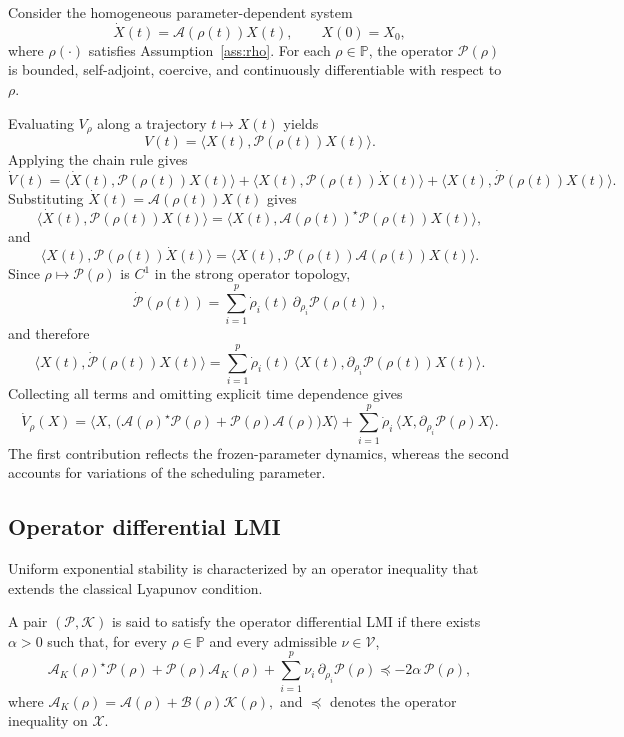 \documentclass[AMA,Times2COL]{WileyNJDv5}
\begin{document}
Consider the homogeneous parameter-dependent system
\begin{equation}\label{eq:LPV-homog}
\dot X(t)=\mathcal{A}(\rho(t))X(t),
\qquad X(0)=X_0,
\end{equation}
where $\rho(\cdot)$ satisfies Assumption~\ref{ass:rho}.  
For each $\rho\in\mathbb{P}$, the operator $\mathcal{P}(\rho)$ is bounded, self-adjoint, coercive, and continuously differentiable with respect to~$\rho$.

Evaluating $V_\rho$ along a trajectory $t\mapsto X(t)$ yields
\[
V(t)=\langle X(t),\mathcal{P}(\rho(t))X(t)\rangle .
\]
Applying the chain rule gives
\[
\dot V(t)
=
\langle \dot X(t),\mathcal{P}(\rho(t))X(t)\rangle
+
\langle X(t),\mathcal{P}(\rho(t))\dot X(t)\rangle
+
\langle X(t),\dot{\mathcal{P}}(\rho(t))X(t)\rangle .
\]
Substituting $\dot X(t)=\mathcal{A}(\rho(t))X(t)$ gives
\[
\langle \dot X(t),\mathcal{P}(\rho(t))X(t)\rangle
=
\langle X(t),\mathcal{A}(\rho(t))^{\star}
\mathcal{P}(\rho(t))X(t)\rangle,
\]
and
\[
\langle X(t),\mathcal{P}(\rho(t))\dot X(t)\rangle
=
\langle X(t),\mathcal{P}(\rho(t))
\mathcal{A}(\rho(t))X(t)\rangle .
\]
Since $\rho\mapsto\mathcal{P}(\rho)$ is $C^1$ in the strong operator topology,
\[
\dot{\mathcal{P}}(\rho(t))
=
\sum_{i=1}^{p}\dot\rho_i(t)\,
\partial_{\rho_i}\mathcal{P}(\rho(t)),
\]
and therefore
\[
\langle X(t),\dot{\mathcal{P}}(\rho(t))X(t)\rangle
=
\sum_{i=1}^{p}\dot\rho_i(t)\,
\langle X(t),\partial_{\rho_i}\mathcal{P}(\rho(t))X(t)\rangle .
\]
Collecting all terms and omitting explicit time dependence gives
\begin{equation}\label{eq:Lyap-derivative}
\dot V_\rho(X)
=
\big\langle X,\,
\big(
\mathcal{A}(\rho)^{\star}\mathcal{P}(\rho)
+
\mathcal{P}(\rho)\mathcal{A}(\rho)
\big)X\big\rangle
+
\sum_{i=1}^{p}\dot\rho_i\,
\big\langle X,\partial_{\rho_i}\mathcal{P}(\rho)X\big\rangle .
\end{equation}
The first contribution reflects the frozen-parameter dynamics, whereas the second accounts for variations of the scheduling parameter.

\subsection{Operator differential LMI}

Uniform exponential stability is characterized by an operator inequality that extends the classical Lyapunov condition.

\begin{definition}\label{def:ODLMI}
A pair $(\mathcal{P},\mathcal{K})$ is said to satisfy the operator differential LMI if there exists $\alpha>0$ such that, for every $\rho\in\mathbb{P}$ and every admissible $\nu\in\mathcal{V}$,
\begin{equation}\label{eq:ODLMI}
\mathcal{A}_K(\rho)^{\star}\mathcal{P}(\rho)
+
\mathcal{P}(\rho)\mathcal{A}_K(\rho)
+
\sum_{i=1}^{p}\nu_i\,\partial_{\rho_i}\mathcal{P}(\rho)
\preceq
-2\alpha\, \mathcal{P}(\rho),
\end{equation}
where
\(
\mathcal{A}_K(\rho)
=
\mathcal{A}(\rho)+\mathcal{B}(\rho)\mathcal{K}(\rho),
\)
and $\preceq$ denotes the operator inequality on $\mathscr{X}$.
\end{definition}
\end{document}
